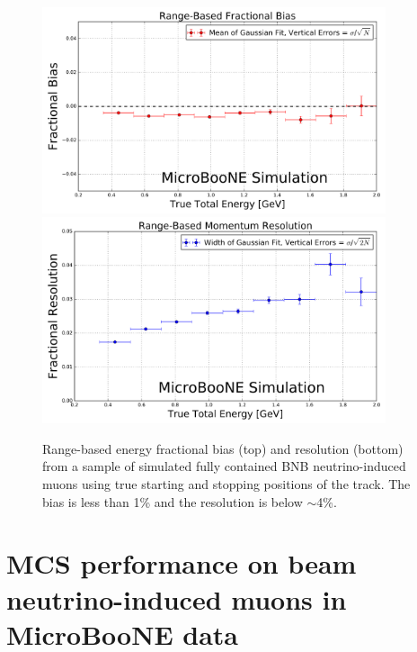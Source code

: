 \documentclass[a4paper,11pt]{article}
\begin{document}
\begin{figure}
\centering
\includegraphics[width=0.9\textwidth]
	{Figures/true_range_bias_MCBNBMCTrack.png}
\includegraphics[width=0.9\textwidth]
	{Figures/true_range_resolution_MCBNBMCTrack.png}
\caption{Range-based energy fractional bias (top) and resolution (bottom) from a sample of simulated fully contained BNB neutrino-induced muons using true starting and stopping positions of the track. The bias is less than 1\% and the resolution is below $\sim$4\%.}
\label{true_range_bias_resolution_MCTrack_fig}
\end{figure}






\section{MCS performance on beam neutrino-induced muons in MicroBooNE data}\label{data_performance_section}
\end{document}

